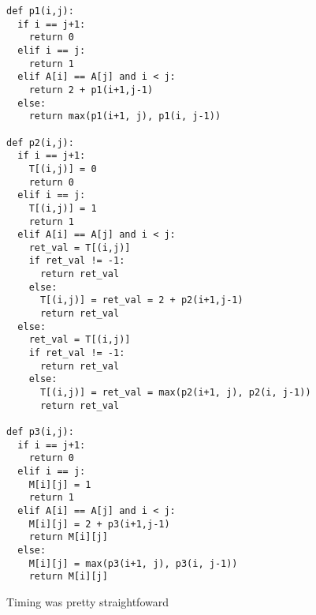 \documentclass[a4paper]{article}
\begin{document}
\begin{verbatim}
def p1(i,j):
  if i == j+1:
    return 0
  elif i == j:
    return 1
  elif A[i] == A[j] and i < j:
    return 2 + p1(i+1,j-1)
  else:
    return max(p1(i+1, j), p1(i, j-1))

def p2(i,j):
  if i == j+1:
    T[(i,j)] = 0
    return 0
  elif i == j:
    T[(i,j)] = 1
    return 1
  elif A[i] == A[j] and i < j:
    ret_val = T[(i,j)]
    if ret_val != -1:
      return ret_val
    else:
      T[(i,j)] = ret_val = 2 + p2(i+1,j-1)
      return ret_val
  else:
    ret_val = T[(i,j)]
    if ret_val != -1:
      return ret_val
    else:
      T[(i,j)] = ret_val = max(p2(i+1, j), p2(i, j-1))
      return ret_val

def p3(i,j):
  if i == j+1:
    return 0
  elif i == j:
    M[i][j] = 1
    return 1
  elif A[i] == A[j] and i < j:
    M[i][j] = 2 + p3(i+1,j-1)
    return M[i][j]
  else:
    M[i][j] = max(p3(i+1, j), p3(i, j-1))
    return M[i][j]
\end{verbatim}

Timing was pretty straightfoward
\end{document}
